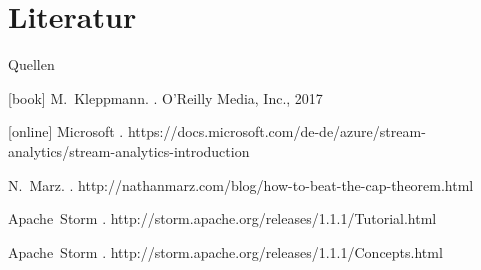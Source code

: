 \documentclass{beamer}
\begin{document}
\section{Literatur}
\begin{frame}[shrink=10]{Quellen}
  \begin{thebibliography}{Kleppmann, 2017}
      [book]
      M.~Kleppmann.
      .
      \newblock O'Reilly Media, Inc., 2017

      [online]
      Microsoft
      .
      \newblock https://docs.microsoft.com/de-de/azure/stream-analytics/stream-analytics-introduction 

      N.~Marz.
      .
      \newblock http://nathanmarz.com/blog/how-to-beat-the-cap-theorem.html 

      Apache~Storm
      .
      \newblock http://storm.apache.org/releases/1.1.1/Tutorial.html 

      Apache~Storm
      .
      \newblock http://storm.apache.org/releases/1.1.1/Concepts.html

  \end{thebibliography}
\end{frame}
\end{document}
